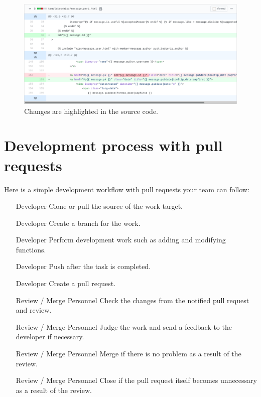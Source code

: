 \documentclass[10pt,a4paper,english]{report}
\begin{document}
    \begin{figure}[ht]
    \begin{center}
    \includegraphics[scale=0.45]{images/pull_requests_004.png}
    \end{center}
    \caption{Changes are highlighted in the source code.}
    \end{figure}

    \section{Development process with pull requests}

    Here is a simple development workflow with pull requests your team can follow:
    \begin{enumerate}
        \item [Developer] Clone or pull the source of the work target.
        \item [Developer] Create a branch for the work.
        \item [Developer] Perform development work such as adding and modifying functions.
        \item [Developer] Push after the task is completed.
        \item [Developer] Create a pull request.
        \item [Review / Merge Personnel] Check the changes from the notified pull request and review.
        \item [Review / Merge Personnel] Judge the work and send a feedback to the developer if necessary.
        \item [Review / Merge Personnel] Merge if there is no problem as a result of the review.
        \item [Review / Merge Personnel] Close if the pull request itself becomes unnecessary as a result of the review.
    \end{enumerate}
\end{document}
